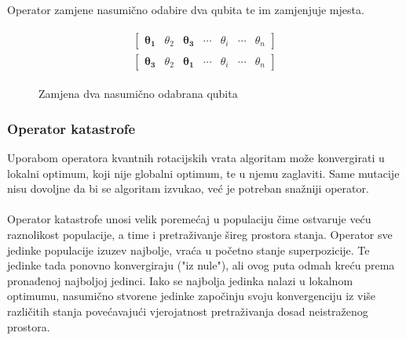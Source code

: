 \documentclass[times, utf8, zavrsni, numeric]{fer}
\begin{document}
\paragraph{}
Operator zamjene nasumično odabire dva qubita te im zamjenjuje mjesta.
\begin{figure}[htb]
\centering
\begin{align*}
\begin{split}
\begin{bmatrix}
\boldsymbol{\theta_{1}} & \theta_{2} & \boldsymbol{\theta_{3}} & \cdots & \theta_{i} & \cdots & \theta_{n}
\end{bmatrix} 
\\
\begin{bmatrix}
\boldsymbol{\theta_{3}} & \theta_{2} & \boldsymbol{\theta_{1}} & \cdots & \theta_{i} & \cdots & \theta_{n}
\end{bmatrix}
\end{split}
\end{align*}
\caption{Zamjena dva nasumično odabrana qubita}
\label{fig:mut_swap}
\end{figure}

\subsubsection{Operator katastrofe}
Uporabom operatora kvantnih rotacijskih vrata algoritam može konvergirati u lokalni optimum, koji nije globalni optimum, te u njemu zaglaviti. Same mutacije nisu dovoljne da bi se algoritam izvukao, već je potreban snažniji operator.

\paragraph{}
Operator katastrofe unosi velik poremećaj u populaciju čime ostvaruje veću raznolikost populacije, a time i pretraživanje šireg prostora stanja. Operator sve jedinke populacije izuzev najbolje, vraća u početno stanje superpozicije. Te jedinke tada ponovno konvergiraju ("iz nule"), ali ovog puta odmah kreću prema pronađenoj najboljoj jedinci. Iako se najbolja jedinka nalazi u lokalnom optimumu, nasumično stvorene jedinke započinju svoju konvergenciju iz više različitih stanja povećavajući vjerojatnost pretraživanja dosad neistraženog prostora.
\end{document}
